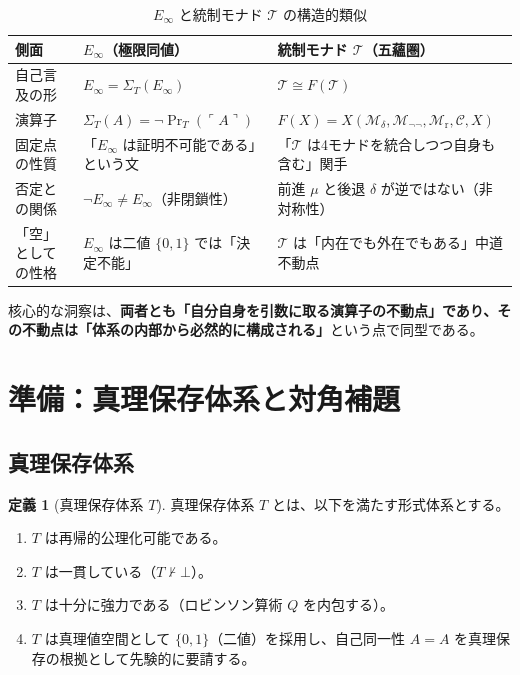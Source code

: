 \documentclass[11pt,a4paper]{article}
\theoremstyle{definition}
\newtheorem{definition}{定義}[section]
\newcommand{\Mdelta}{\mathcal{M}_{\delta}}
\newcommand{\Mneg}{\mathcal{M}_{\neg\neg}}
\newcommand{\Mr}{\mathcal{M}_{\mathrm{r}}}
\newcommand{\Mc}{\mathcal{C}}
\newcommand{\T}{\mathcal{T}}
\newcommand{\fold}{\mu}
\newcommand{\unfold}{\delta}
\newcommand{\Einf}{E_{\infty}}
\begin{document}
\begin{table}[h]
\centering
\caption{$\Einf$ と統制モナド $\T$ の構造的類似}
\begin{tabular}{lll}
\hline
\textbf{側面} & \textbf{$\Einf$（極限同値）} & \textbf{統制モナド $\T$（五蘊圏）} \\
\hline
自己言及の形 & $\Einf = \Sigma_T(\Einf)$ & $\T \cong F(\T)$ \\
演算子 & $\Sigma_T(A) = \neg\Pr_T(\ulcorner A \urcorner)$ & $F(X) = X(\Mdelta, \Mneg, \Mr, \Mc, X)$ \\
固定点の性質 & 「$\Einf$ は証明不可能である」という文 & 「$\T$ は4モナドを統合しつつ自身も含む」関手 \\
否定との関係 & $\neg \Einf \neq \Einf$（非閉鎖性） & 前進 $\fold$ と後退 $\unfold$ が逆ではない（非対称性） \\
「空」としての性格 & $\Einf$ は二値 $\{0,1\}$ では「決定不能」 & $\T$ は「内在でも外在でもある」中道不動点 \\
\hline
\end{tabular}
\end{table}

核心的な洞察は、\textbf{両者とも「自分自身を引数に取る演算子の不動点」であり、その不動点は「体系の内部から必然的に構成される」}という点で同型である。

\section{準備：真理保存体系と対角補題}

\subsection{真理保存体系}

\begin{definition}[真理保存体系 $T$]\label{def:truth-preserving}
真理保存体系 $T$ とは、以下を満たす形式体系とする。
\begin{enumerate}[label=(\arabic*)]
\item $T$ は再帰的公理化可能である。
\item $T$ は一貫している（$T \nvdash \bot$）。
\item $T$ は十分に強力である（ロビンソン算術 $Q$ を内包する）。
\item $T$ は真理値空間として $\{0,1\}$（二値）を採用し、自己同一性 $A=A$ を真理保存の根拠として先験的に要請する。
\end{enumerate}
\end{definition}
\end{document}
